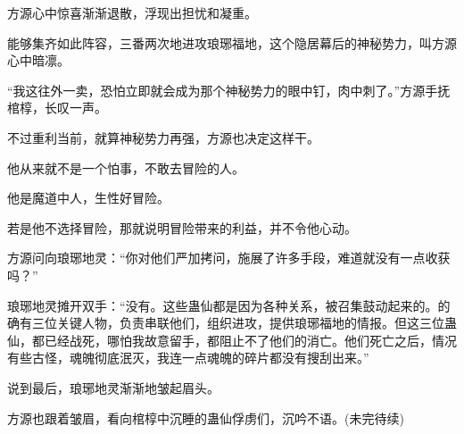\begin{this_body}
方源心中惊喜渐渐退散，浮现出担忧和凝重。

能够集齐如此阵容，三番两次地进攻琅琊福地，这个隐居幕后的神秘势力，叫方源心中暗凛。

“我这往外一卖，恐怕立即就会成为那个神秘势力的眼中钉，肉中刺了。”方源手抚棺椁，长叹一声。

不过重利当前，就算神秘势力再强，方源也决定这样干。

他从来就不是一个怕事，不敢去冒险的人。

他是魔道中人，生性好冒险。

若是他不选择冒险，那就说明冒险带来的利益，并不令他心动。

方源问向琅琊地灵：“你对他们严加拷问，施展了许多手段，难道就没有一点收获吗？”

琅琊地灵摊开双手：“没有。这些蛊仙都是因为各种关系，被召集鼓动起来的。的确有三位关键人物，负责串联他们，组织进攻，提供琅琊福地的情报。但这三位蛊仙，都已经战死，哪怕我故意留手，都阻止不了他们的消亡。他们死亡之后，情况有些古怪，魂魄彻底泯灭，我连一点魂魄的碎片都没有搜刮出来。”

说到最后，琅琊地灵渐渐地皱起眉头。

方源也跟着皱眉，看向棺椁中沉睡的蛊仙俘虏们，沉吟不语。(未完待续)

\end{this_body}

